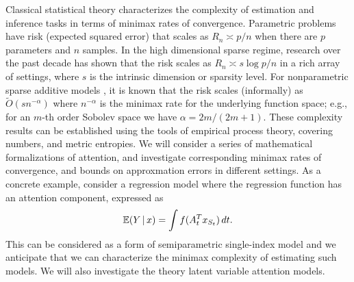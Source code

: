 Classical statistical theory characterizes the complexity of
estimation and inference tasks in terms of minimax rates of
convergence. Parametric problems have risk (expected squared error)
that scales as $R_n \asymp p/n$ when there are $p$ parameters and $n$
samples. In the high dimensional sparse regime, research over the past
decade has shown that the risk scales as $R_n \asymp s \log p/n$ 
in a rich array of settings, where $s$ is the intrinsic dimension or
sparsity level. For nonparametric sparse additive
models \citep{Ravikumar:08}, it is known that the risk
scales (informally) as $\tilde O(s n^{-\alpha})$ where $n^{-\alpha}$ is 
the minimax rate for the underlying function space;
e.g., for an $m$-th order Sobolev space we have
$\alpha = 2m/(2m+1)$. These complexity results can be established using
the tools of empirical process theory, covering numbers, and metric
entropies. We will consider a series of mathematical formalizations
of attention, and investigate corresponding minimax rates of 
convergence, and bounds on approxmation errors in different settings.
As a concrete example, consider a regression model where the regression function 
has an attention component, expressed as 
$$ \mbox{$\mathbb{E}$}(Y\,|\, x) = \int f(A_t^T x_{S_t}) \, dt.$$
This can be considered as a form of semiparametric single-index model
\citep{horowitz09,horowitz96,ichimura93,kakade11,negahban12} 
and we anticipate that we can characterize
the minimax complexity of estimating such models. We will also investigate
the theory latent variable attention models.





 
